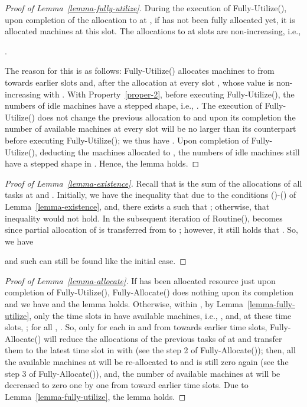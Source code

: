 \documentclass[10pt,journal,compsoc]{IEEEtran}
\newcommand{\rmnum}[1]{\romannumeral #1}
\begin{document}
\begin{proof}[Proof of Lemma~\ref{lemma-fully-utilize}]
During the execution of Fully-Utilize(), upon completion of the allocation to  at , if  has not been fully allocated yet, it is allocated  machines at this slot.
The allocations to  at slots  are non-increasing, i.e.,
\begin{center}
.
\end{center}
The reason for this is as follows: Fully-Utilize() allocates machines to  from  towards earlier slots and, after the allocation at every slot ,  whose value is non-increasing with . With Property~\ref{proper-2}, before executing Fully-Utilize(), the numbers of idle machines have a stepped shape, i.e., . The execution of Fully-Utilize() does not change the previous allocation to  and upon its completion the number of available machines  at every slot  will be no larger than its counterpart before executing Fully-Utilize(); we thus have . Upon completion of Fully-Utilize(), deducting the machines allocated to , the numbers of idle machines still have a stepped shape in . Hence, the lemma holds.
\end{proof}




\begin{proof}[Proof of Lemma~\ref{lemma-existence}]
Recall that  is the sum of the allocations  of all tasks  at  and . Initially, we have the inequality that  due to the conditions (\rmnum{1})-(\rmnum{3}) of Lemma~\ref{lemma-existence}, and, there exists a  such that ; otherwise, that inequality would not hold. In the subsequent iteration of Routine(),  becomes  since partial allocation of  is transferred from  to ; however, it still holds that . So, we have
\begin{center}

\end{center}
and such  can still be found like the initial case.
\end{proof}


\begin{proof}[Proof of Lemma~\ref{lemma-allocate}]
 If  has been allocated  resource just upon completion of Fully-Utilize(), Fully-Allocate() does nothing upon its completion and we have  and the lemma holds. Otherwise, within , by Lemma~\ref{lemma-fully-utilize}, only the time slots  in  have available machines, i.e., , and, at these time slots, ; for all , . So, only for each  in  and from  towards earlier time slots, Fully-Allocate() will reduce the allocations of the previous tasks of  at  and transfer them to the latest time slot  in  with  (see the step 2 of Fully-Allocate()); then, all the available machines at  will be re-allocated to  and  is still zero again (see the step 3 of Fully-Allocate()), and, the number of available machines at  will be decreased to zero one by one from  toward earlier time slots. Due to Lemma~\ref{lemma-fully-utilize}, the lemma holds.
\end{proof}
\end{document}
